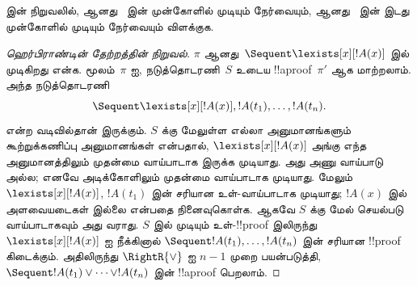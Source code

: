 \documentclass[../../../include/open-logic-section]{subfiles}
\begin{document}
\begin{prob}
 இன் நிறுவலில்,
\LeftR{\lexists} ஆனது~\RightR{\lif} இன்
முன்கோளில் முடியும் நேர்வையும்,
\LeftR{\lforall} ஆனது~\LeftR{\lor} இன்
இடது முன்கோளில் முடியும் நேர்வையும் விளக்குக.
\end{prob}

\begin{proof}[ஹெர்பிராண்டின் தேற்றத்தின் நிறுவல்]
$\pi$ ஆனது~$\Sequent \lexists[x][!A(x)]$
இல் முடிகிறது என்க.
 மூலம்~$\pi$ ஐ,
நடுத்தொடரணி~$S$ உடைய !!a{proof}~$\pi'$
ஆக மாற்றலாம். அந்த நடுத்தொடரணி
\[\Sequent \lexists[x][!A(x)], !A(t_1), \dots, !A(t_n).\]
என்ற வடிவில்தான் இருக்கும். $S$ க்கு
மேலுள்ள எல்லா அனுமானங்களும் கூற்றுக்கணிப்பு
அனுமானங்கள் என்பதால், $\lexists[x][!A(x)]$
அங்கு எந்த அனுமானத்திலும் முதன்மை
வாய்பாடாக இருக்க முடியாது. அது அணு
வாய்பாடு அல்ல; எனவே அடிக்கோளிலும்
முதன்மை வாய்பாடாக முடியாது. மேலும்
$\lexists[x][!A(x)]$, $!A(t_1)$ இன்
சரியான உள்-வாய்பாடாக முடியாது;
$!A(x)$ இல் அளவையடைகள் இல்லை என்பதை
நினைவுகொள்க. ஆகவே $S$ க்கு மேல்
செயல்படு வாய்பாடாகவும் அது வராது.
$S$ இல் முடியும் உள்-!!{proof} இலிருந்து
$\lexists[x][!A(x)]$ ஐ நீக்கினால்
$\Sequent !A(t_1), \dots, !A(t_n)$
இன் சரியான !!{proof} கிடைக்கும்.
அதிலிருந்து $\RightR{\lor}$ ஐ $n-1$
முறை பயன்படுத்தி,
$\Sequent !A(t_1) \lor \dots \lor !A(t_n)$
இன் !!a{proof} பெறலாம்.
\end{proof}

\end{document}

